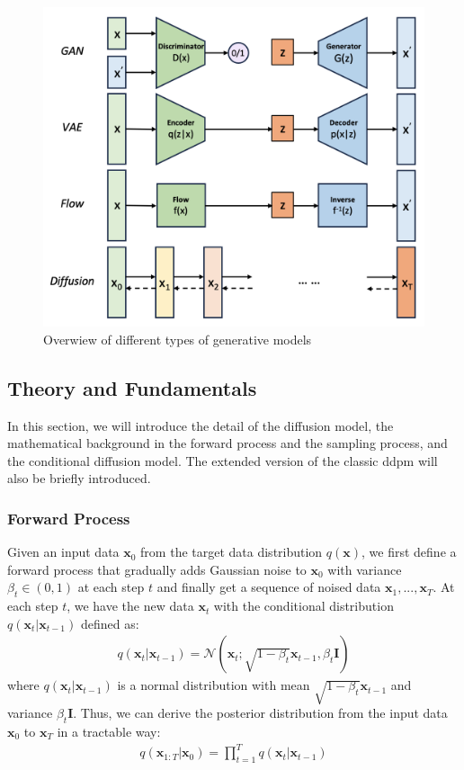 \documentclass[12pt,DIV14,BCOR12mm,a4paper,footinclude=false,headinclude,parskip=half-,twoside,openright,cleardoublepage=empty,toc=index,bibliography=totoc,listof=totoc]{scrreprt}
\numberwithin{equation}{chapter}
\begin{document}
\begin{figure}[h]
	\centering
	\includegraphics[scale=.3]{img/gen.png}
	\caption{Overwiew of different types of generative models}
	\label{img:gen}
\end{figure}

\subsection{Theory and Fundamentals}\label{sec:theory}
In this section, we will introduce the detail of the diffusion model, the mathematical background in the forward process and the sampling process, and the conditional diffusion model. The extended version of the classic \gls{ddpm} will also be briefly introduced.

\subsubsection{Forward Process}
Given an input data $\mathbf{x}_{0}$ from the target data distribution $q(\mathbf{x})$, we first define a forward process that gradually adds Gaussian noise to $\mathbf{x}_{0}$ with variance $\beta_{t}\in (0, 1)$ at each step $t$ and finally get a sequence of noised data $\mathbf{x}_{1},...,\mathbf{x}_{T}$. At each step $t$, we have the new data $\mathbf{x}_{t}$ with the conditional distribution $q(\mathbf{x}_{t}|\mathbf{x}_{t-1})$ defined as:
\begin{align}
  q(\mathbf{x}_{t}|\mathbf{x}_{t-1}) = \mathcal{N}(\mathbf{x}_{t}; \sqrt{1-\beta_{t}}\mathbf{x}_{t-1}, \beta_{t}\mathbf{I})
\end{align}
where $q(\mathbf{x}_{t}|\mathbf{x}_{t-1})$ is a normal distribution with mean $\sqrt{1-\beta_{t}}\mathbf{x}_{t-1}$ and variance $\beta_{t}\mathbf{I}$. Thus, we can derive the posterior distribution from the input data $\mathbf{x}_{0}$ to $\mathbf{x}_{T}$ in a tractable way:
\begin{align}
  q(\mathbf{x}_{1:T}|\mathbf{x}_{0}) = \prod_{t=1}^{T}q(\mathbf{x}_{t}|\mathbf{x}_{t-1})
\end{align}
\end{document}
